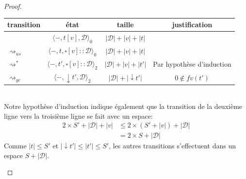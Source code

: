 \documentclass[11pt,a4paper]{article}
\theoremstyle{definition}
\newcommand{\etatz}[1]{\langle #1 \rangle_0}
\newcommand{\etatd}[1]{\langle #1 \rangle_2}
\newcommand{\mtd}{\mathcal{D}}
\newcommand{\da}{\downarrow}
\begin{document}
\begin{proof}
\begin{itemize}
\begin{tabular}{@{}l c c c@{}}
        \toprule
        transition & état & taille & justification\\
        \midrule
                   & $\etatz{-,t[v],\mtd}$ & $|\mtd|+|v|+|t|$\\
        $\rightsquigarrow_{us}$ & $ \etatz{-, t, \square[v]::\mtd}$ & $|\mtd| + |v| + |t|$\\ 
        $\rightsquigarrow^*$ & $ \etatd{-, t' ,\square[v]::\mtd}$ & $|\mtd| + |v| + |t'|$& Par hypothèse d'induction\\
      $\rightsquigarrow_{gc}$ & $ \etatd{-, \da t' ,\mtd}$ & $|\mtd| + |\da t'|$&$ 0\notin fv(t') $\\
        \bottomrule
      \end{tabular}\\
      Notre hypothèse d'induction indique également que la transition de la deuxième ligne vers la troisième ligne se fait avec un espace: 
      \begin{align*}
        2 \times S' +|\mtd| + |v| &\le 2\times(S'+|v|) +|\mtd|\\ 
                                  &= 2 \times S + |\mtd|
       \end{align*}
Comme $|t| \le S'$ et $|\da t'|\le|t'| \le S'$, les autres transitions s'effectuent dans un espace $S+|\mtd|$.

\end{itemize}
\end{proof}
\end{document}
